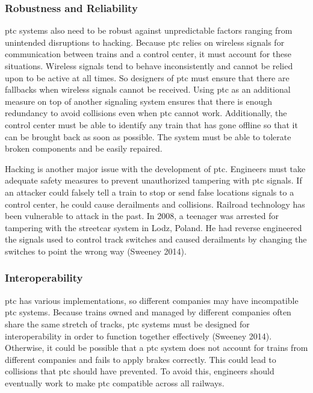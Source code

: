 \documentclass[11pt, titlepage]{article}
\begin{document}
\subsubsection{Robustness and Reliability}

\gls{ptc} systems also need to be robust against unpredictable factors ranging from
unintended disruptions to hacking. Because \gls{ptc} relies on wireless signals for
communication between trains and a control center, it must account for these
situations. Wireless signals tend to behave inconsistently and cannot be relied
upon to be active at all times. So designers of \gls{ptc} must ensure that there
are fallbacks when wireless signals cannot be received. Using \gls{ptc} as an
additional measure on top of another signaling system ensures that there is enough
redundancy to avoid collisions even when \gls{ptc} cannot work. Additionally, the
control center must be able to identify any train that has gone offline so that it
can be brought back as soon as possible. The system must be able to tolerate broken
components and be easily repaired.

Hacking is another major issue with the development of \gls{ptc}. Engineers must
take adequate safety measures to prevent unauthorized tampering with \gls{ptc}
signals. If an attacker could falsely tell a train to stop or send false locations
signals to a control center, he could cause derailments and collisions. Railroad
technology has been vulnerable to attack in the past. In 2008, a teenager was
arrested for tampering with the streetcar system in Lodz, Poland. He had reverse
engineered the signals used to control track switches and caused derailments by
changing the switches to point the wrong way (Sweeney 2014).

\subsubsection{Interoperability}

\gls{ptc} has various implementations, so different companies may have incompatible
\gls{ptc} systems. Because trains owned and managed by different companies often
share the same stretch of tracks, \gls{ptc} systems must be designed for
interoperability in order to function together effectively (Sweeney 2014).
Otherwise, it could be possible that a \gls{ptc} system does not account for trains
from different companies and fails to apply brakes correctly. This could lead to
collisions that \gls{ptc} should have prevented. To avoid this, engineers should
eventually work to make \gls{ptc} compatible across all railways.
\end{document}
